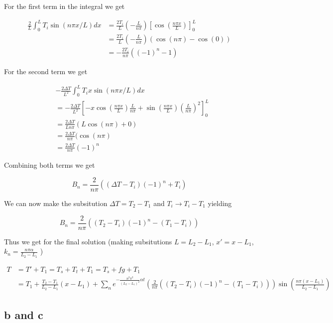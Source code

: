 \documentclass{article}
\begin{document}
For the first term in the integral we get

\begin{align}
\frac{2}{L} \int_0^L T_i \sin(n\pi x /L) dx  &= \frac{2 T_i}{L} (-\frac{L}{n\pi})\left[\cos(\frac{n\pi x}{L}) \right]_0^L \\ 
&= \frac{2 T_i}{L} (-\frac{L}{n\pi}) (\cos(n\pi) - \cos(0)) \\
&= - \frac{2 T_i}{n\pi}((-1)^n - 1)
\end{align}

For the second term we get

\begin{align}
	& -\frac{2\Delta T}{L^2} \int_0^L T_i x\sin(n\pi x /L) dx  \\
& = -\frac{2\Delta T}{L^2} \left[-x \cos(\frac{n\pi x}{L})\frac{L}{n\pi} + \sin(\frac{n\pi x}{L})\left(\frac{L}{n\pi}\right)^2\right]_0^L \\
&= \frac{2\Delta T}{Ln\pi} (L\cos( n \pi) + 0) \\
&= \frac{2\Delta T}{n\pi} (\cos( n \pi) \\
& = \frac{2\Delta T}{n\pi} (-1)^n
\end{align}

Combining both terms we get

\begin{equation}
	B_n = \frac{2}{n\pi} \left((\Delta T-T_i)(-1)^n + T_i \right)
\end{equation}

We can now make the subsitution $\Delta T = T_2 - T_1$ and $T_i \rightarrow T_i -T_1$ yielding

\begin{equation}
	B_n = \frac{2}{n\pi} \left((T_2 - T_i)(-1)^n - (T_1-T_i) \right)
\end{equation}

Thus we get for the final solution (making subsitutions $L = L_2-L_1$, $x' = x -L_1$, $k_n = \frac{n\pi\alpha}{L_2-L_1}$  )

\begin{align}
\label{eq:final}
	T &= T' + T_1 = T_s + T_t + T_1= T_s + fg + T_1 \\
	&= T_1 + \frac{T_2-T_1}{L_2-L_1}(x-L_1) + \sum_n e^{- \frac{n^2\pi^2}{(L_2-L_1)^2}\alpha   t}  \left(\frac{2}{n\pi} \left((T_2 - T_i)(-1)^n - (T_1-T_i) \right) \right) \sin(\frac{n\pi (x-L_1)}{L_2-L_1}) 
\end{align}


\subsection*{b and c}
\end{document}
